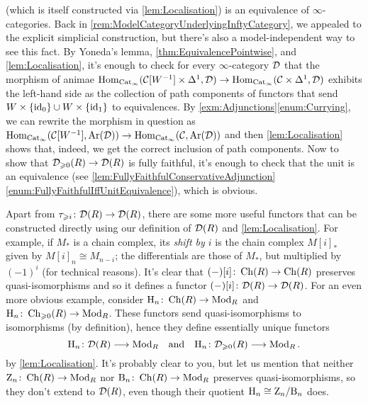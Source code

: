 \begin{numpar}
{	(which is itself constructed via \cref{lem:Localisation}) is an equivalence of $\infty$-categories. Back in \cref{rem:ModelCategoryUnderlyingInftyCategory}, we appealed to the explicit simplicial construction, but there's also a model-independent way to see this fact. By Yoneda's lemma, \cref{thm:EquivalencePointwise}, and \cref{lem:Localisation}, it's enough to check for every $\infty$-category $\mathcal{D}$ that the morphism of animae $\operatorname{Hom}_{\mathrm{Cat}_\infty}(\mathcal{C}[W^{-1}]\times\Delta^1,\mathcal{D})\rightarrow \operatorname{Hom}_{\mathrm{Cat}_\infty}(\mathcal{C}\times\Delta^1,\mathcal{D})$ exhibits the left-hand side as the collection of path components of functors that send $W\times\{\operatorname{id}_0\}\cup W\times\{\operatorname{id}_1\}$ to equivalences. By \cref{exm:Adjunctions}\cref{enum:Currying}, we can rewrite the morphism in question as $\operatorname{Hom}_{\mathrm{Cat}_\infty}(\mathcal{C}[W^{-1}],\operatorname{Ar}(\mathcal{D}))\rightarrow \operatorname{Hom}_{\mathrm{Cat}_\infty}(\mathcal{C},\operatorname{Ar}(\mathcal{D}))$ and then \cref{lem:Localisation} shows that, indeed, we get the correct inclusion of path components.} Now to show that $\mathcal{D}_{\geqslant 0}(R)\rightarrow \mathcal{D}(R)$ is fully faithful, it's enough to check that the unit is an equivalence (see \cref{lem:FullyFaithfulConservativeAdjunction}\cref{enum:FullyFaithfulIffUnitEquivalence}), which is obvious.
	
	Apart from $\tau_{\geqslant i}\colon \mathcal{D}(R)\rightarrow \mathcal{D}(R)$, there are some more useful functors that can be constructed directly using our definition of $\mathcal{D}(R)$ and \cref{lem:Localisation}. For example, if $M_*$ is a chain complex, its \emph{shift by $i$} is the chain complex $M[i]_*$ given by $M[i]_n\cong M_{n-i}$; the differentials are those of $M_*$, but multiplied by $(-1)^i$ (for technical reasons). It's clear that $(-)[i]\colon \operatorname{Ch}(R)\rightarrow \operatorname{Ch}(R)$ preserves quasi-isomorphisms and so it defines a functor $(-)[i]\colon \mathcal{D}(R)\rightarrow \mathcal{D}(R)$. For an even more obvious example, consider $\mathrm{H}_n\colon \operatorname{Ch}(R)\rightarrow \mathrm{Mod}_R$ and $\mathrm{H}_n\colon \operatorname{Ch}_{\geqslant 0}(R)\rightarrow \mathrm{Mod}_R$. These functors send quasi-isomorphisms to isomorphisms (by definition), hence they define essentially unique functors
	\begin{equation*}
		\mathrm{H}_n\colon\mathcal{D}(R)\longrightarrow\mathrm{Mod}_R\quad\text{and}\quad \mathrm{H}_n\colon\mathcal{D}_{\geqslant 0}(R)\longrightarrow\mathrm{Mod}_R\,.
	\end{equation*}
	by \cref{lem:Localisation}. It's probably clear to you, but let us mention that neither $\mathrm{Z}_n\colon \operatorname{Ch}(R)\rightarrow \mathrm{Mod}_R$ nor $\mathrm{B}_n\colon \operatorname{Ch}(R)\rightarrow \mathrm{Mod}_R$ preserves quasi-isomorphisms, so they don't extend to $\mathcal{D}(R)$, even though their quotient $\mathrm{H}_n\cong \mathrm{Z}_n/\mathrm{B}_n$ does.
\end{numpar}
